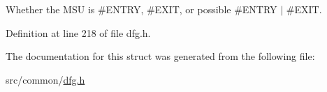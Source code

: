 Whether the M\-S\-U is \#\-E\-N\-T\-R\-Y, \#\-E\-X\-I\-T, or possible \#\-E\-N\-T\-R\-Y $\vert$ \#\-E\-X\-I\-T. 



Definition at line 218 of file dfg.\-h.



The documentation for this struct was generated from the following file\-:\begin{DoxyCompactItemize}
\item 
src/common/\hyperlink{dfg_8h}{dfg.\-h}\end{DoxyCompactItemize}

